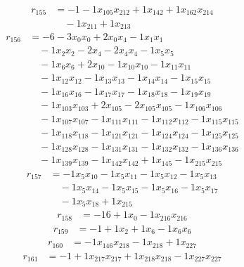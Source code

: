 \[\begin{aligned}
r_{155} &= - 1 - 1 x_{105} x_{212} + 1 x_{142} + 1 x_{162} x_{214} \\
 &\quad - 1 x_{211} + 1 x_{213}
\end{aligned}\]
\[\begin{aligned}
r_{156} &= - 6 - 3 x_{0} x_{0} + 2 x_{0} x_{4} - 1 x_{1} x_{1} \\
 &\quad - 1 x_{2} x_{2} - 2 x_{4} - 2 x_{4} x_{4} - 1 x_{5} x_{5} \\
 &\quad - 1 x_{6} x_{6} + 2 x_{10} - 1 x_{10} x_{10} - 1 x_{11} x_{11} \\
 &\quad - 1 x_{12} x_{12} - 1 x_{13} x_{13} - 1 x_{14} x_{14} - 1 x_{15} x_{15} \\
 &\quad - 1 x_{16} x_{16} - 1 x_{17} x_{17} - 1 x_{18} x_{18} - 1 x_{19} x_{19} \\
 &\quad - 1 x_{103} x_{103} + 2 x_{105} - 2 x_{105} x_{105} - 1 x_{106} x_{106} \\
 &\quad - 1 x_{107} x_{107} - 1 x_{111} x_{111} - 1 x_{112} x_{112} - 1 x_{115} x_{115} \\
 &\quad - 1 x_{118} x_{118} - 1 x_{121} x_{121} - 1 x_{124} x_{124} - 1 x_{125} x_{125} \\
 &\quad - 1 x_{128} x_{128} - 1 x_{131} x_{131} - 1 x_{132} x_{132} - 1 x_{136} x_{136} \\
 &\quad - 1 x_{139} x_{139} - 1 x_{142} x_{142} + 1 x_{145} - 1 x_{215} x_{215}
\end{aligned}\]
\[\begin{aligned}
r_{157} &= - 1 x_{5} x_{10} - 1 x_{5} x_{11} - 1 x_{5} x_{12} - 1 x_{5} x_{13} \\
 &\quad - 1 x_{5} x_{14} - 1 x_{5} x_{15} - 1 x_{5} x_{16} - 1 x_{5} x_{17} \\
 &\quad - 1 x_{5} x_{18} + 1 x_{215}
\end{aligned}\]
\[\begin{aligned}
r_{158} &= - 16 + 1 x_{0} - 1 x_{216} x_{216}
\end{aligned}\]
\[\begin{aligned}
r_{159} &= - 1 + 1 x_{2} + 1 x_{6} - 1 x_{6} x_{6}
\end{aligned}\]
\[\begin{aligned}
r_{160} &= - 1 x_{146} x_{218} - 1 x_{218} + 1 x_{227}
\end{aligned}\]
\[\begin{aligned}
r_{161} &= - 1 + 1 x_{217} x_{217} + 1 x_{218} x_{218} - 1 x_{227} x_{227}
\end{aligned}\]
